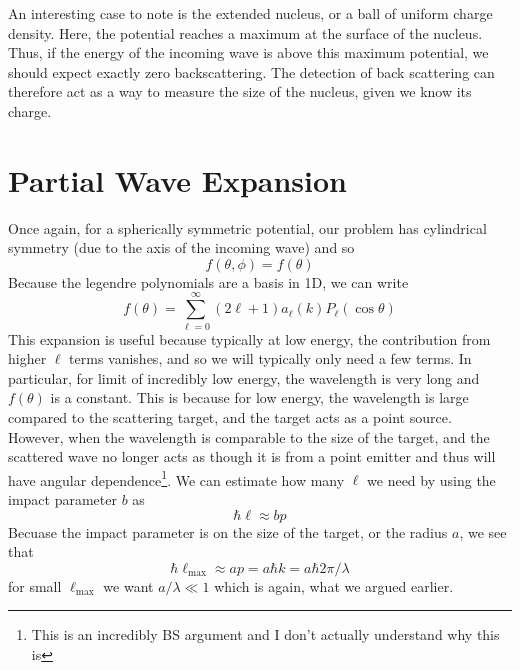 An interesting case to note is the extended nucleus, or a ball of uniform charge density. Here, the potential reaches a maximum at the surface of the nucleus. Thus, if the energy of the incoming wave is above this maximum potential, we should expect exactly zero backscattering. The detection of back scattering can therefore act as a way to measure the size of the nucleus, given we know its charge.

\section{Partial Wave Expansion}
Once again, for a spherically symmetric potential, our problem has cylindrical symmetry (due to the axis of the incoming wave) and so
\[f(\theta,\phi) = f(\theta)\]
Because the legendre polynomials are a basis in 1D, we can write
\[f(\theta) = \sum_{\ell=0}^\infty (2\ell+1)a_\ell(k) P_\ell(\cos\theta)\]
This expansion is useful because typically at low energy, the contribution from higher \(\ell\) terms vanishes, and so we will typically only need a few terms. In particular, for limit of incredibly low energy, the wavelength is very long and \(f(\theta)\) is a constant. This is because for low energy, the wavelength is large compared to the scattering target, and the target acts as a point source. However, when the wavelength is comparable to the size of the target, and the scattered wave no longer acts as though it is from a point emitter and thus will have angular dependence\footnote{This is an incredibly BS argument and I don't actually understand why this is}. We can estimate how many \(\ell\) we need by using the impact parameter \(b\) as 
\[\hbar \ell\approx b p\]
Becuase the impact parameter is on the size of the target, or the radius \(a\), we see that
\[\hbar\ell_{\max}\approx ap = a\hbar k = a\hbar2\pi/\lambda\]
for small \(\ell_{\max}\) we want \(a/\lambda\ll1\) which is again, what we argued earlier.

